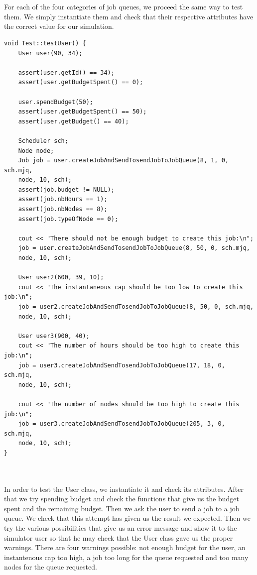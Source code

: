 \documentclass [10 pt, a4 paper]{report}
\begin{document}
\noindent
\\ \\ 
For each of the four categories of job queues, we proceed the same way to test them. We simply instantiate them and check that their respective attributes have the correct value for our simulation.



\clearpage
\begin{lstlisting}[caption=testUser function of the class Test, label={lst:code1}, frame=single]
void Test::testUser() {
	User user(90, 34);

	assert(user.getId() == 34);
	assert(user.getBudgetSpent() == 0);

	user.spendBudget(50);
	assert(user.getBudgetSpent() == 50);
	assert(user.getBudget() == 40);

	Scheduler sch;
	Node node;
	Job job = user.createJobAndSendTosendJobToJobQueue(8, 1, 0, sch.mjq, 
	node, 10, sch);
	assert(job.budget != NULL);
	assert(job.nbHours == 1);
	assert(job.nbNodes == 8);
	assert(job.typeOfNode == 0);

	cout << "There should not be enough budget to create this job:\n";
	job = user.createJobAndSendTosendJobToJobQueue(8, 50, 0, sch.mjq, 
	node, 10, sch);

	User user2(600, 39, 10);
	cout << "The instantaneous cap should be too low to create this job:\n";
	job = user2.createJobAndSendTosendJobToJobQueue(8, 50, 0, sch.mjq, 
	node, 10, sch);

	User user3(900, 40);
	cout << "The number of hours should be too high to create this job:\n";
	job = user3.createJobAndSendTosendJobToJobQueue(17, 18, 0, sch.mjq, 
	node, 10, sch);

	cout << "The number of nodes should be too high to create this job:\n";
	job = user3.createJobAndSendTosendJobToJobQueue(205, 3, 0, sch.mjq, 
	node, 10, sch);
}
\end{lstlisting}

\noindent
\\ \\ 
In order to test the User class, we instantiate it and check its attributes. After that we try spending budget and check the functions that give us the budget spent and the remaining budget. Then we ask the user to send a job to a job queue. We check that this attempt has given us the result we expected. Then we try the various possibilities that give us an error message and show it to the simulator user so that he may check that the User class gave us the proper warnings. There are four warnings possible: not enough budget for the user, an instantenous cap too high, a job too long for the queue requested and too many nodes for the queue requested.
\end{document}

